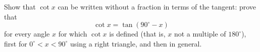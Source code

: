 Show that $\cot x$ can be written without a fraction in terms of the tangent: prove that
\[
\cot x=\tan\left(90^\circ-x\right)
\]
for every angle $x$ for which $\cot x$ is defined (that is, $x$ not a multiple of $180^\circ$), first for $0^\circ<x<90^\circ$ using a right triangle, and then in general.
